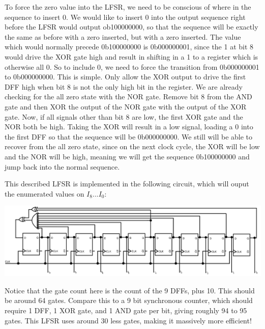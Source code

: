 \documentclass{article}
\begin{document}
\begin{enumerate}
            To force the zero value into the LFSR, we need to be conscious of
            where in the sequence to insert 0. We would like to insert 0 into
            the output sequence right before the LFSR would output ob100000000,
            so that the sequence will be exactly the same as before with a zero
            inserted, but with a zero inserted. The value which would normally
            precede 0b100000000 is 0b000000001, since the 1 at bit 8 would drive
            the XOR gate high and result in shifting in a 1 to a register which
            is otherwise all 0. So to include 0, we need to force the transition
            from 0b000000001 to 0b000000000. This is simple. Only allow the XOR
            output to drive the first DFF high when bit 8 is not the only high 
            bit in the register. We are already checking for the all zero state
            with the NOR gate. Remove bit 8 from the AND gate and then XOR the
            output of the NOR gate with the output of the XOR gate. Now, if all
            signals other than bit 8 are low, the first XOR gate and the NOR
            both be high. Taking the XOR will result in a low signal, loading a
            0 into the first DFF so that the sequence will be 0b000000000. We
            still will be able to recover from the all zero state, since on the
            next clock cycle, the XOR will be low and the NOR will be high,
            meaning we will get the sequence 0b100000000 and jump back into the 
            normal sequence.

            This described LFSR is implemented in the following circuit, which
            will ouput the enumerated values on $I_8...I_0$:
            \begin{center}
                \includegraphics[width=\textwidth]{figs/p2.jpeg}
            \end{center}

            Notice that the gate count here is the count of the 9 DFFs, plus 10.
            This should be around 64 gates. Compare this to a 9 bit synchronous
            counter, which should require 1 DFF, 1 XOR gate, and 1 AND gate per
            bit, giving roughly 94 to 95 gates. This LFSR uses around 30 less
            gates, making it massively more efficient!
            \pagebreak


\end{enumerate}
\end{document}
